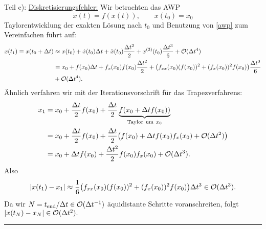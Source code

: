 \documentclass[11pt,a4paper]{article}
\begin{document}
\begin{loes}
Teil c): \underline{Diskretisierungsfehler:}
Wir betrachten das AWP \begin{equation}\label{awp} \dot x(t) = f(x(t)), \qquad x(t_0) = x_0\end{equation}
Taylorentwicklung der exakten L\"osung nach $t_0$ und Benutzung von \eqref{awp} zum Vereinfachen f\"uhrt auf:
\begin{align*} 
x(t_1) \equiv x(t_0 + \Delta t) &\approx x(t_0) + \dot x(t_0)\Delta t + \ddot x(t_0)\frac{\Delta t^2}{2} + x^{(3)}(t_0)\frac{\Delta t^3}{6} + \mathcal{O}(\Delta t^4)\\
&= x_0 + f(x_0)\Delta t + f_x(x_0)f(x_0)\frac{\Delta t^2}{2} + \big(f_{xx}(x_0)(f(x_0))^2 + (f_x(x_0))^2f(x_0)\big)\frac{\Delta t^3}{6} \\ &+ \mathcal{O}(\Delta t^4). 
\end{align*}
\"Ahnlich verfahren wir mit der Iterationsvorschrift f\"ur das Trapezverfahrens:
\begin{align*} 
x_1 &= x_0 + \frac{\tstep}{2}f(x_0) + \frac{\tstep}{2}\underbrace{f(x_0 + \tstep f(x_0))}_{\mathrm{Taylor \ um\ } x_0} \\
&= x_0 + \frac{\tstep}{2}f(x_0) + \frac{\tstep}{2}\big(f(x_0) + \tstep f(x_0)f_x(x_0) + \bigO(\tstep^2)\big)\\
&= x_0 + \tstep f(x_0) + \frac{\tstep^2}{2}f(x_0)f_x(x_0) + \bigO(\tstep^3). 
\end{align*}
Also \begin{align*} |x(t_1) - x_1| \approx \frac{1}{6}\big(f_{xx}(x_0)(f(x_0))^2 + (f_x(x_0))^2f(x_0)\big)\Delta t^3 \in \mathcal{O}(\Delta t^3).  \end{align*}
Da wir $N = t_{\mathrm{end}}/\Delta t \in \mathcal{O}(\Delta t^{-1})$ \"aquidistante Schritte voranschreiten, folgt $|x(t_N) - x_N| \in \mathcal{O}(\Delta t^2).$ \quoterat
\end{loes}


\bigskip
\hrule
\begin{flushright}
\end{flushright}

\end{document}
